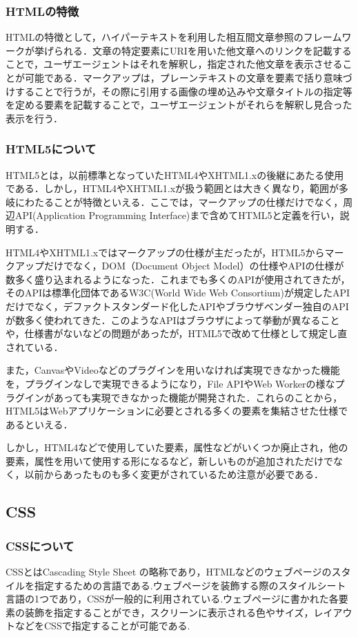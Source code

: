 \documentclass[a4j,12pt]{jarticle}
\begin{document}
\subsubsection{HTMLの特徴}
HTMLの特徴として，ハイパーテキストを利用した相互間文章参照のフレームワークが挙げられる．文章の特定要素にURIを用いた他文章へのリンクを記載することで，ユーザエージェントはそれを解釈し，指定された他文章を表示させることが可能である．マークアップは，プレーンテキストの文章を要素で括り意味づけすることで行うが，その際に引用する画像の埋め込みや文章タイトルの指定等を定める要素を記載することで，ユーザエージェントがそれらを解釈し見合った表示を行う\cite{ren8}．
\subsubsection{HTML5について}
HTML5とは，以前標準となっていたHTML4やXHTML1.xの後継にあたる使用である．しかし，HTML4やXHTML1.xが扱う範囲とは大きく異なり，範囲が多岐にわたることが特徴といえる．ここでは，マークアップの仕様だけでなく，周辺API(Application Programming Interface)まで含めてHTML5と定義を行い，説明する．

HTML4やXHTML1.xではマークアップの仕様が主だったが，HTML5からマークアップだけでなく，DOM（Document Object Model）の仕様やAPIの仕様が数多く盛り込まれるようになった．これまでも多くのAPIが使用されてきたが，そのAPIは標準化団体であるW3C(World Wide Web Consortium)が規定したAPIだけでなく，デファクトスタンダード化したAPIやブラウザベンダー独自のAPIが数多く使われてきた．このようなAPIはブラウザによって挙動が異なることや，仕様書がないなどの問題があったが，HTML5で改めて仕様として規定し直されている．

また，CanvasやVideoなどのプラグインを用いなければ実現できなかった機能を，プラグインなしで実現できるようになり，File APIやWeb Workerの様なプラグインがあっても実現できなかった機能が開発された．これらのことから，HTML5はWebアプリケーションに必要とされる多くの要素を集結させた仕様であるといえる．

しかし，HTML4などで使用していた要素，属性などがいくつか廃止され，他の要素，属性を用いて使用する形になるなど，新しいものが追加されただけでなく，以前からあったものも多く変更がされているため注意が必要である\cite{ren8}．
\newpage
\subsection{CSS}
\subsubsection{CSSについて}
CSSとはCascading Style Sheet の略称であり，HTMLなどのウェブページのスタイルを指定するための言語である.ウェブページを装飾する際のスタイルシート言語の1つであり，CSSが一般的に利用されている.ウェブページに書かれた各要素の装飾を指定することができ，スクリーンに表示される色やサイズ，レイアウトなどをCSSで指定することが可能である.
\end{document}
